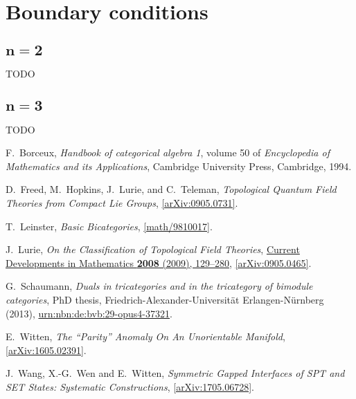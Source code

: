 \documentclass[12pt]{scrartcl}
\newcommand\arxiv[2]      {\href{http://arXiv.org/abs/#1}{#2}}
\theoremstyle{definition}
\numberwithin{equation}{section}
\numberwithin{definition}{section}
\numberwithin{figure}{section}
\begin{document}
\section{Boundary conditions}

\subsection[$n=2$]{$\boldsymbol{n=2}$}

TODO

\subsection[$n=3$]{$\boldsymbol{n=3}$}

TODO






\begin{thebibliography}{BDSPV}

F.~Borceux, 
\textsl{Handbook of categorical algebra 1}, 
volume 50 of \textsl{Encyclopedia of Mathematics and its Applications}, 
Cambridge University Press, Cambridge, 1994.

D.~Freed, M.~Hopkins, J.~Lurie, and C.~Teleman,
\textsl{Topological Quantum Field Theories from Compact Lie Groups}, 
\href{http://arxiv.org/abs/0905.0731}{[\mbox{arXiv:}0905.0731]}. 

T.~Leinster, 
\textsl{Basic Bicategories}, 
\href{http://arxiv.org/abs/math/9810017}{[math/9810017]}.

J.~Lurie, 
\textsl{On the Classification of Topological Field Theories},
\href{https://projecteuclid.org/euclid.cdm/1254748657}{Current Developments in Mathematics \textbf{2008} (2009), 129--280}, 
\arxiv{0905.0465}{[arXiv:0905.0465]}.

G.~Schaumann, 
\textsl{Duals in tricategories and in the tricategory of bimodule categories}, 
PhD thesis, 
Friedrich-Alexander-Universit\"at Erlangen-N\"urnberg (2013), 
\href{http://nbn-resolving.de/urn/resolver.pl?urn:nbn:de:bvb:29-opus4-37321}{urn:nbn:de:bvb:29-opus4-37321}.

E.~Witten, 
\textsl{The ``Parity'' Anomaly On An Unorientable Manifold}, 
\href{http://arxiv.org/abs/1605.02391}{[arXiv:1605.02391]}.  

J.~Wang, X.-G.~Wen and E.~Witten, 
\textsl{Symmetric Gapped Interfaces of SPT and SET States: Systematic Constructions}, 
\href{http://arxiv.org/abs/1705.06728}{[arXiv:1705.06728]}.  




\end{thebibliography}
\end{document}
